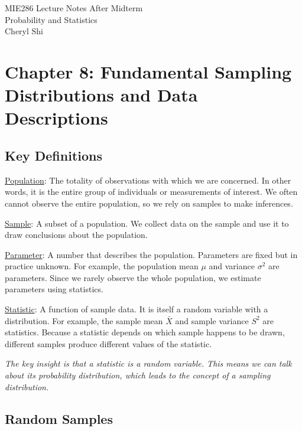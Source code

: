 \documentclass[10pt]{report}
\begin{document}
\begin{titlepage}
\centering
\vspace*{1cm}
{\LARGE MIE286 Lecture Notes After Midterm }\\[0.4cm]
{\large Probability and Statistics}\\[0.4cm]
{\large Cheryl Shi}\\[2cm]
\end{titlepage}

\tableofcontents
\newpage

\chapter{Chapter 8: Fundamental Sampling Distributions and Data Descriptions}

\section{Key Definitions}

\underline{Population}: The totality of observations with which we are concerned. In other words, it is the entire group of individuals or measurements of interest. We often cannot observe the entire population, so we rely on samples to make inferences.

\underline{Sample}: A subset of a population. We collect data on the sample and use it to draw conclusions about the population.

\underline{Parameter}: A number that describes the population. Parameters are fixed but in practice unknown. For example, the population mean $\mu$ and variance $\sigma^2$ are parameters. Since we rarely observe the whole population, we estimate parameters using statistics.

\underline{Statistic}: A function of sample data. It is itself a random variable with a distribution. For example, the sample mean $\bar{X}$ and sample variance $S^2$ are statistics. Because a statistic depends on which sample happens to be drawn, different samples produce different values of the statistic.

\textit{The key insight is that a statistic is a random variable. This means we can talk about its probability distribution, which leads to the concept of a sampling distribution.}

\section{Random Samples}
\end{document}
